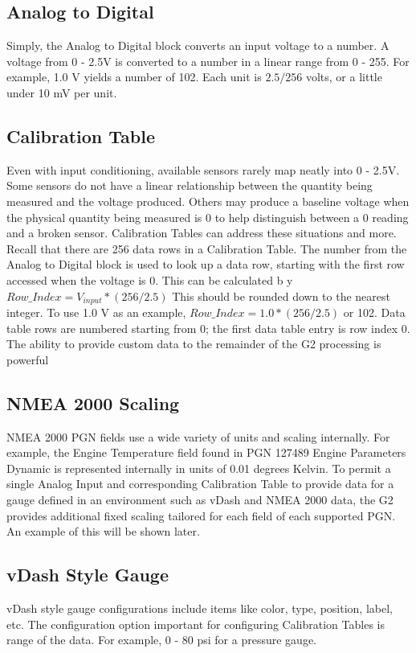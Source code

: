 \documentclass[12pt, letterpaper, twoside, titlepage]{article}
\begin{document}
\subsection{Analog to Digital}
 Simply, the Analog to Digital block converts an input voltage to a number.  A voltage from 0 - 2.5V is converted to a number in a linear range from 0 - 255. For example, 1.0 V yields a number of 102.  Each unit is $ 2.5 / 256$  volts, or a little under 10 mV per unit. 


\subsection{Calibration Table}
Even with input conditioning, available sensors rarely map neatly into 0 - 2.5V.  Some sensors do not have a linear relationship between the quantity being measured and the voltage produced.  Others may produce a baseline voltage when the physical quantity being measured is 0 to help distinguish between a 0 reading and a broken sensor. Calibration Tables can address these situations and more.  Recall that there are 256 data rows in a Calibration Table. The number from the Analog to Digital block is used to look up a data row, starting with the first row accessed when the voltage is 0.  This can be calculated b y$  Row\_Index = V_{input} * (256 / 2.5) $  This should be rounded down to the nearest integer.   To use 1.0 V as an example,  $ Row\_Index = 1.0 * (256 / 2.5) $ or 102.  Data table rows are numbered starting from 0; the first data table entry is row index 0.  The ability to provide custom data to the remainder of the G2 processing is powerful

\subsection{NMEA 2000 Scaling}
NMEA 2000 PGN fields use a wide variety of units and scaling internally.  For example, the Engine Temperature field found in PGN 127489  Engine Parameters Dynamic  is represented internally in units of 0.01 degrees Kelvin.  To permit a single Analog Input and corresponding Calibration Table to provide data for a gauge defined in an environment such as vDash and NMEA 2000 data, the G2 provides additional fixed scaling tailored for each field of each supported PGN.  An example of this will be shown later.

\subsection{vDash Style Gauge}
vDash style gauge configurations include items like color, type, position, label, etc.  The configuration option important for configuring Calibration Tables is range of the data. For example, 0 - 80 psi for a pressure gauge. 
\end{document}
